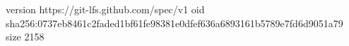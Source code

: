 version https://git-lfs.github.com/spec/v1
oid sha256:0737eb8461c2faded1bf61fe98381e0dfef636a6893161b5789e7fd6d9051a79
size 2158
